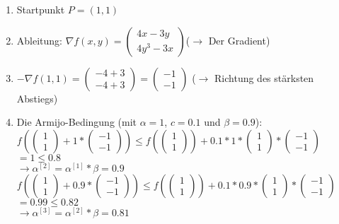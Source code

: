 \documentclass[a4paper, 11pt]{article}
\begin{document}
\begin{enumerate}
	\item 
	Startpunkt $P=(1,1)$
	\item 
	Ableitung: ${\nabla}f(x,y)=
	\left( \begin{array}{c}
	4x-3y \\ 
	4y^3-3x 
	\end{array} \right)
	$($\rightarrow$ Der Gradient)
	\item
	$-{\nabla}f(1,1) =
	\left( \begin{array}{c}
	-4+3 \\ 
	-4+3 
	\end{array} \right)
	=
	\left( \begin{array}{c}
	-1 \\ 
	-1
	\end{array} \right)
	$ ($\rightarrow$ Richtung des stärksten Abstiegs)
	\item
	Die Armijo-Bedingung (mit $\alpha = 1$, $c = 0.1$ und $\beta = 0.9$):\\
	$f( \left( \begin{array}{c} 1 \\ 1 \end{array} \right) + 1 * \left( \begin{array}{c} -1 \\ -1 \end{array} \right)) \leq f(\left( \begin{array}{c} 1 \\ 1 \end{array} \right)) + 0.1 * 1 *  \left( \begin{array}{c} 1 \\ 1 \end{array} \right) * \left( \begin{array}{c} -1 \\ -1 \end{array} \right)$ \\
	$= 1 \leq 0.8$ \\
	$\rightarrow \alpha^{[2]} = \alpha^{[1]} * \beta = 0.9$ \\
	
	$f( \left( \begin{array}{c} 1 \\ 1 \end{array} \right) + 0.9 * \left( \begin{array}{c} -1 \\ -1 \end{array} \right)) \leq f(\left( \begin{array}{c} 1 \\ 1 \end{array} \right)) + 0.1 * 0.9 *  \left( \begin{array}{c} 1 \\ 1 \end{array} \right) * \left( \begin{array}{c} -1 \\ -1 \end{array} \right)$ \\
	$= 0.99 \leq 0.82$ \\
	$\rightarrow \alpha^{[3]} = \alpha^{[2]} * \beta = 0.81$ \\
	

\end{enumerate}
\end{document}
